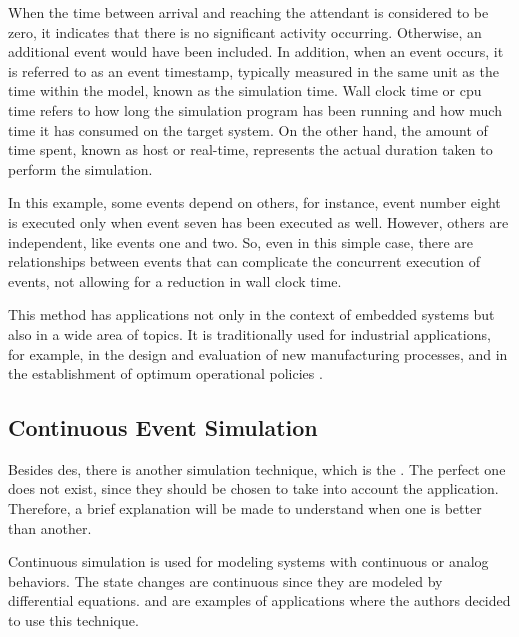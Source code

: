 When the time between arrival and reaching the attendant is considered to be zero, it indicates that there is no significant activity occurring. 
Otherwise, an additional event would have been included. In addition, when an event occurs, it is referred to as an event timestamp, typically 
measured in the same unit as the time within the model, known as the simulation time. Wall clock time or \gls{cpu} time refers to how long the 
simulation program has been running and how much time it has consumed on the target system. On the other hand, the amount of time 
spent, known as host or real-time, represents the actual duration taken to perform the simulation.

In this example, some events depend on others, for instance, event number eight is executed only when event seven has been executed as well. 
However, others are independent, like events one and two. So, even in this simple case, there are relationships between events that can complicate 
the concurrent execution of events, not allowing for a reduction in wall clock time.

This method has applications not only in the context of embedded systems but also in a wide area of topics. It is traditionally used for 
industrial applications, for example, in the design and evaluation of new
manufacturing processes, and in the establishment of optimum operational policies \cite{DES_SoA}. 

 
\subsection{Continuous Event Simulation}

Besides \gls{des}, there is another simulation technique, which is the . The perfect one does not exist, since they should be 
chosen to take into account the application. Therefore, a brief explanation will be made to understand when one is better than another.

Continuous simulation is used for modeling systems with continuous or analog behaviors. The state changes are continuous since they are modeled 
by differential equations. \cite{continousSim1} and \cite{continousSim2} are examples of applications where the authors decided to use this 
technique. 

